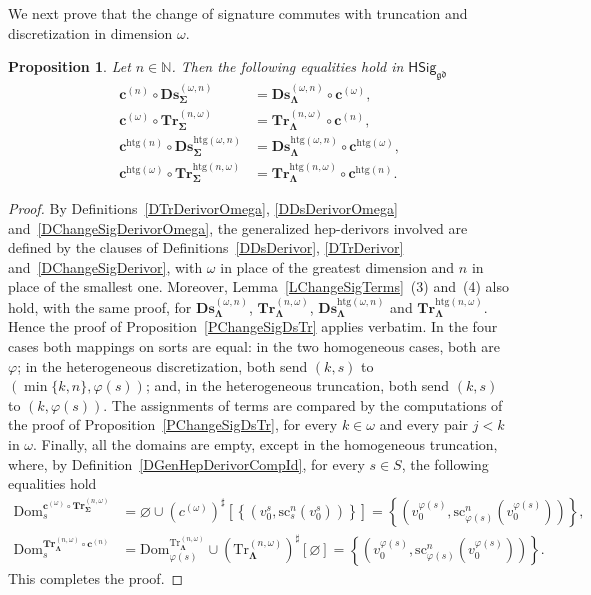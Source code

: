 \documentclass[a4paper, reqno]{amsbook}
\newcommand{\sig}[1]{\mathbf{#1}}             %
\newcommand{\Dom}{\mathrm{Dom}}
\newcommand{\gd}{\mathfrak{gd}}              %
\newcommand{\htg}{\mathrm{htg}}                %
\newcommand{\src}{\mathrm{sc}}
\newcommand{\Tr}{\mathrm{Tr}}
\newcommand{\bDs}{\mathbf{Ds}}
\newcommand{\bTr}{\mathbf{Tr}}
\theoremstyle{plain}
\newtheorem{proposition}[theorem]{Proposition}
\theoremstyle{definition}
\begin{document}
We next prove that the change of signature commutes with truncation and discretization in dimension $\omega$.

\begin{proposition}\label{PChangeSigDsTrOmega}
Let $n\in\mathbb{N}$.
Then the following equalities hold in $\mathsf{HSig}_{\gd}$
\begin{align*}
\mathbf{c}^{(n)}\circ\bDs^{(\omega,n)}_{\sig{\Sigma}}&=\bDs^{(\omega,n)}_{\sig{\Lambda}}\circ\mathbf{c}^{(\omega)},
\\
\mathbf{c}^{(\omega)}\circ\bTr^{(n,\omega)}_{\sig{\Sigma}}&=\bTr^{(n,\omega)}_{\sig{\Lambda}}\circ\mathbf{c}^{(n)},
\\
\mathbf{c}^{\htg(n)}\circ\bDs^{\htg(\omega,n)}_{\sig{\Sigma}}&=\bDs^{\htg(\omega,n)}_{\sig{\Lambda}}\circ\mathbf{c}^{\htg(\omega)},
\\
\mathbf{c}^{\htg(\omega)}\circ\bTr^{\htg(n,\omega)}_{\sig{\Sigma}}&=\bTr^{\htg(n,\omega)}_{\sig{\Lambda}}\circ\mathbf{c}^{\htg(n)}.
\end{align*}
\end{proposition}
\begin{proof}
By Definitions~\ref{DTrDerivorOmega}, \ref{DDsDerivorOmega} and~\ref{DChangeSigDerivorOmega}, the generalized hep-derivors involved are defined by the clauses of Definitions~\ref{DDsDerivor}, \ref{DTrDerivor} and~\ref{DChangeSigDerivor}, with $\omega$ in place of the greatest dimension and $n$ in place of the smallest one.
Moreover, Lemma~\ref{LChangeSigTerms}~(3) and~(4) also hold, with the same proof, for $\bDs^{(\omega,n)}_{\sig{\Lambda}}$, $\bTr^{(n,\omega)}_{\sig{\Lambda}}$, $\bDs^{\htg(\omega,n)}_{\sig{\Lambda}}$ and $\bTr^{\htg(n,\omega)}_{\sig{\Lambda}}$.
Hence the proof of Proposition~\ref{PChangeSigDsTr} applies verbatim.
In the four cases both mappings on sorts are equal: in the two homogeneous cases, both are $\varphi$; in the heterogeneous discretization, both send $(k,s)$ to $(\min\{k,n\},\varphi(s))$; and, in the heterogeneous truncation, both send $(k,s)$ to $(k,\varphi(s))$.
The assignments of terms are compared by the computations of the proof of Proposition~\ref{PChangeSigDsTr}, for every $k\in\omega$ and every pair $j<k$ in $\omega$.
Finally, all the domains are empty, except in the homogeneous truncation, where, by Definition~\ref{DGenHepDerivorCompId}, for every $s\in S$, the following equalities hold
\begin{align*}
\Dom^{\mathbf{c}^{(\omega)}\circ\bTr^{(n,\omega)}_{\sig{\Sigma}}}_{s}
&=
\varnothing\cup(c^{(\omega)})^{\sharp}\left[\left\lbrace\left(v^{s}_{0},\src^{n}_{s}(v^{s}_{0})\right)\right\rbrace\right]
=
\left\lbrace\left(v^{\varphi(s)}_{0},\src^{n}_{\varphi(s)}(v^{\varphi(s)}_{0})\right)\right\rbrace,
\\
\Dom^{\bTr^{(n,\omega)}_{\sig{\Lambda}}\circ\mathbf{c}^{(n)}}_{s}
&=
\Dom^{\Tr^{(n,\omega)}_{\sig{\Lambda}}}_{\varphi(s)}\cup(\Tr^{(n,\omega)}_{\sig{\Lambda}})^{\sharp}[\varnothing]
=
\left\lbrace\left(v^{\varphi(s)}_{0},\src^{n}_{\varphi(s)}(v^{\varphi(s)}_{0})\right)\right\rbrace.
\end{align*}
This completes the proof.
\end{proof}
\end{document}
